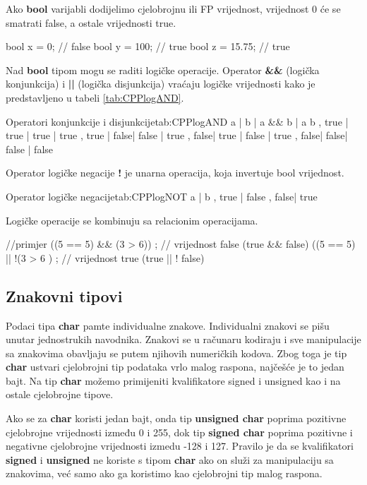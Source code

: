 \documentclass[11pt]{book}
\begin{document}
Ako \textbf{bool} varijabli dodijelimo cjelobrojnu ili FP vrijednost, vrijednost 0 će se smatrati false, a ostale vrijednosti true.

\begin{shortlisting}
  bool x = 0;  // false
  bool y = 100;  // true
  bool z = 15.75;  // true
\end{shortlisting}

Nad \textbf{bool} tipom mogu se raditi logičke operacije. Operator \textbf{\&\&} (logička konjunkcija) i \textbf{||} (logička disjunkcija) vraćaju logičke vrijednosti kako je predstavljeno u tabeli \ref{tab:CPPlogAND}.

 {Operatori konjunkcije i disjunkcije}{tab:CPPlogAND}
{
  a    | b    | a \&\& b | a  \vbr \vbr b ,
  true | true | true     | true ,
  true | false|  false   | true ,
  false| true | false    | true ,
  false| false|  false   |  false
}

Operator logičke negacije \textbf{!} je unarna operacija, koja invertuje bool vrijednost.

 {Operator logičke negacije}{tab:CPPlogNOT}
{
  a  |  b    ,
  true |  false ,
  false| true
}

Logičke operacije se kombinuju sa relacionim operacijama.

\begin{shortlisting}
  //primjer
  ((5 == 5) && (3 > 6)) ;  // vrijednost  false (true && false)
  ((5 == 5) || !(3 > 6 ) ; // vrijednost true (true || ! false)
\end{shortlisting}

\subsection{Znakovni tipovi}
Podaci tipa \textbf{char} pamte individualne znakove. Individualni znakovi se pišu unutar jednostrukih navodnika. Znakovi se u računaru kodiraju i sve manipulacije sa znakovima obavljaju se putem njihovih numeričkih kodova. Zbog toga je tip \textbf{char} ustvari cjelobrojni tip podataka vrlo malog raspona, najčešće je to jedan bajt. Na tip \textbf{char} možemo primijeniti kvalifikatore signed i unsigned kao i na ostale cjelobrojne tipove.

Ako se za \textbf{char} koristi jedan bajt, onda tip \textbf{unsigned char} poprima pozitivne cjelobrojne vrijednosti između 0 i 255, dok tip \textbf{signed char} poprima pozitivne i negativne cjelobrojne vrijednosti izmedu -128 i 127. Pravilo je da se kvalifikatori \textbf{signed} i \textbf{unsigned} ne koriste s tipom \textbf{char} ako on služi za manipulaciju sa znakovima, već samo ako ga koristimo kao cjelobrojni tip malog raspona.
\end{document}
